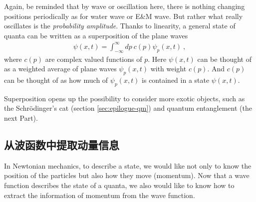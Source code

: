 {    Again, be reminded that by wave or oscillation here, there is nothing changing positions periodically as for water wave or E\&M wave. But rather what really oscillates is the \emph{probability amplitude}.
    \tcblower
    Thanks to linearity, a general state of quanta can be written as a superposition of the plane waves
    \begin{align}
        \label{eq:superposition_plane_wave_psi}
        \psi(x,t) = \int_{-\infty}^{\infty} dp ~ c(p) \psi_p(x,t)~,
    \end{align}
    where $c(p)$ are complex valued functions of $p$. Here $\psi(x,t)$ can be thought of as a weighted average of plane waves $\psi_p(x,t)$ with weight $c(p)$. And $c(p)$ can be thought of as how much of $\psi_p(x,t)$ is contained in a state $\psi(x,t)$.
}


Superposition opens up the possibility to consider more exotic objects, such as the Schr{\"o}dinger's cat (section \ref{sec:epilogue-qm}) and quantum entanglement (the next Part). 

\subsection{从波函数中提取动量信息} \label{sec:wave-func-momentum}

In Newtonian mechanics, to describe a state, we would like not only to know the position of the particles but also how they move (momentum). Now that a wave function describes the state of a quanta, we also would like to know how to extract the information of momentum from the wave function.


